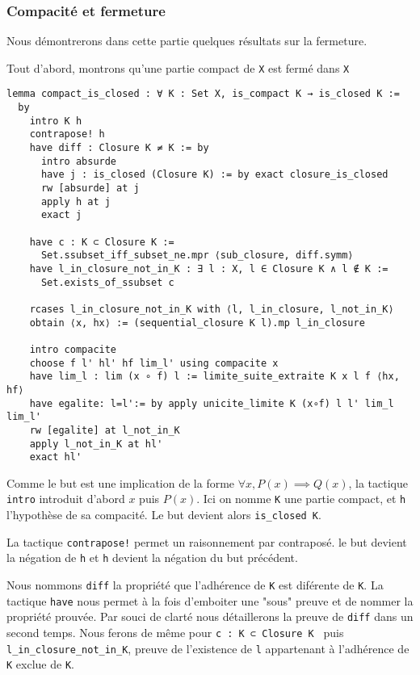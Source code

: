 \documentclass[a4paper, 12pt]{article}
\newcommand{\lean}[1]{\texttt{#1}}
\begin{document}
\subsubsection{Compacité et fermeture}
Nous démontrerons dans cette partie quelques résultats sur la fermeture.

Tout d'abord, montrons qu'une partie compact de \lean{X} est fermé dans \lean{X}

\begin{verbatim}   
lemma compact_is_closed : ∀ K : Set X, is_compact K → is_closed K := 
  by
    intro K h
    contrapose! h
    have diff : Closure K ≠ K := by
      intro absurde
      have j : is_closed (Closure K) := by exact closure_is_closed
      rw [absurde] at j
      apply h at j
      exact j

    have c : K ⊂ Closure K :=
      Set.ssubset_iff_subset_ne.mpr ⟨sub_closure, diff.symm⟩
    have l_in_closure_not_in_K : ∃ l : X, l ∈ Closure K ∧ l ∉ K :=
      Set.exists_of_ssubset c

    rcases l_in_closure_not_in_K with ⟨l, l_in_closure, l_not_in_K⟩
    obtain ⟨x, hx⟩ := (sequential_closure K l).mp l_in_closure

    intro compacite
    choose f l' hl' hf lim_l' using compacite x
    have lim_l : lim (x ∘ f) l := limite_suite_extraite K x l f ⟨hx, hf⟩
    have egalite: l=l':= by apply unicite_limite K (x∘f) l l' lim_l lim_l'
    rw [egalite] at l_not_in_K
    apply l_not_in_K at hl'
    exact hl'
\end{verbatim}

Comme le but est une implication de la forme $ \forall x, P(x) \implies Q(x)$, la tactique \lean{intro} introduit d'abord $x$ puis $P(x)$. Ici on nomme \lean{K} une partie compact, et \lean{h} l'hypothèse de sa compacité. Le but devient alors \lean{is_closed K}.

La tactique \lean{contrapose!} permet un raisonnement par contraposé. le but devient la négation de \lean{h} et \lean{h} devient la négation du but précédent.

Nous nommons \lean{diff} la propriété que l'adhérence de \lean{K} est diférente de \lean{K}. La tactique \lean{have} nous permet à la fois d'emboiter une "sous" preuve et de nommer la propriété prouvée. Par souci de clarté nous détaillerons la preuve de \lean{diff} dans un second temps. Nous ferons de même pour \lean{c : K ⊂ Closure K } puis \lean{l_in_closure_not_in_K}, preuve de l'existence de \lean{l} appartenant à l'adhérence de \lean{K} exclue de \lean{K}. 
\end{document}
